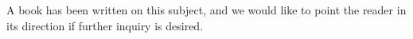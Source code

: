 A book has been written on this subject, and we would like to point the reader in its direction if further inquiry is desired\cite{linuxdevicedrivers}.